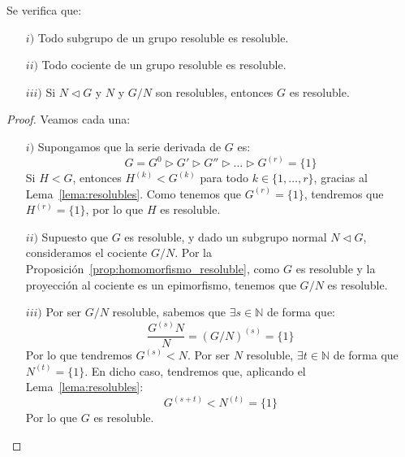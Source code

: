 \begin{prop}
    Se verifica que:
    \begin{enumerate}
        \item[$i)$] Todo subgrupo de un grupo resoluble es resoluble.
        \item[$ii)$] Todo cociente de un grupo resoluble es resoluble.
        \item[$iii)$] Si $N\lhd G$ y $N$ y $G/N$ son resolubles, entonces $G$ es resoluble.
    \end{enumerate}
    \begin{proof}
        Veamos cada una:
        \begin{enumerate}
            \item[$i)$] Supongamos que la serie derivada de $G$ es:
                \begin{equation*}
                    G = G^0 \rhd G' \rhd G '' \rhd \ldots \rhd G^{(r)} = \{1\}
                \end{equation*}
                Si $H<G$, entonces $H^{(k)} < G^{(k)}$ para todo $k \in \{1,\ldots,r\}$, gracias al Lema~\ref{lema:resolubles}. Como tenemos que $G^{(r)} = \{1\}$, tendremos que $H^{(r)} = \{1\}$, por lo que $H$ es resoluble.
            \item[$ii)$] Supuesto que $G$ es resoluble, y dado un subgrupo normal $N\lhd G$, consideramos el cociente $G/N$.
                Por la Proposición~\ref{prop:homomorfismo_resoluble}, como $G$ es resoluble y la proyección al cociente es un epimorfismo, tenemos que $G/N$ es resoluble.
            \item[$iii)$] Por ser $G/N$ resoluble, sabemos que $\exists s\in \mathbb{N}$ de forma que:
                \begin{equation*}
                    \dfrac{G^{(s)}N}{N} = {(G/N)}^{(s)} = \{1\}
                \end{equation*}
                Por lo que tendremos $G^{(s)} < N$. Por ser $N$ resoluble, $\exists t\in \mathbb{N}$ de forma que $N^{(t)} =\{1\}$. En dicho caso, tendremos que, aplicando el Lema~\ref{lema:resolubles}:
                \begin{equation*}
                    G^{(s+t)} < N^{(t)} = \{1\}
                \end{equation*}
                Por lo que $G$ es resoluble.\qedhere
        \end{enumerate}
    \end{proof}
\end{prop}

